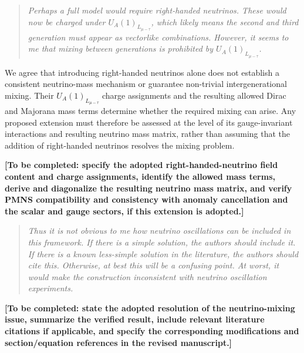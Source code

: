 \documentclass[12pt,a4paper]{article}
\begin{document}
\medskip
{}

\begin{quote}\itshape
Perhaps a full model would require right-handed neutrinos. These would now be charged under \(U_A(1)_{L_{\mu-\tau}}\), which likely means the second and third generation must appear as vectorlike combinations. However, it seems to me that mixing between generations is prohibited by \(U_A(1)_{L_{\mu-\tau}}\).
\end{quote}


We agree that introducing right-handed neutrinos alone does not establish a consistent neutrino-mass mechanism or guarantee non-trivial intergenerational mixing. Their \(U_A(1)_{L_{\mu-\tau}}\) charge assignments and the resulting allowed Dirac and Majorana mass terms determine whether the required mixing can arise. Any proposed extension must therefore be assessed at the level of its gauge-invariant interactions and resulting neutrino mass matrix, rather than assuming that the addition of right-handed neutrinos resolves the mixing problem.

\textbf{[To be completed: specify the adopted right-handed-neutrino field content and charge assignments, identify the allowed mass terms, derive and diagonalize the resulting neutrino mass matrix, and verify PMNS compatibility and consistency with anomaly cancellation and the scalar and gauge sectors, if this extension is adopted.]}

\medskip
{}

\begin{quote}\itshape
Thus it is not obvious to me how neutrino oscillations can be included in this framework. If there is a simple solution, the authors should include it. If there is a known less-simple solution in the literature, the authors should cite this. Otherwise, at best this will be a confusing point. At worst, it would make the construction inconsistent with neutrino oscillation experiments.
\end{quote}


\textbf{[To be completed: state the adopted resolution of the neutrino-mixing issue, summarize the verified result, include relevant literature citations if applicable, and specify the corresponding modifications and section/equation references in the revised manuscript.]}
\end{document}
